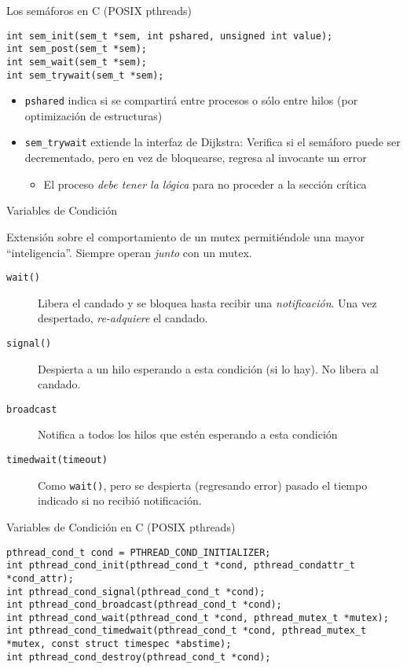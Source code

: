 \documentclass[presentation]{beamer}
\begin{document}
\begin{frame}[label={sec:org82672c1},fragile]{Los semáforos en C (POSIX pthreads)}
 \begin{verbatim}
int sem_init(sem_t *sem, int pshared, unsigned int value);
int sem_post(sem_t *sem);
int sem_wait(sem_t *sem);
int sem_trywait(sem_t *sem);
\end{verbatim}

\begin{itemize}
\item \texttt{pshared} indica si se compartirá entre procesos o sólo entre hilos
(por optimización de estructuras)
\item \texttt{sem\_trywait} extiende la interfaz de Dijkstra: Verifica si el
semáforo puede ser decrementado, pero en vez de bloquearse, regresa
al invocante un error
\begin{itemize}
\item El proceso \emph{debe tener la lógica} para no proceder a la sección
crítica
\end{itemize}
\end{itemize}
\end{frame}

\begin{frame}[label={sec:orgc8ec4ff},fragile]{Variables de Condición}
 \begin{center}
Extensión sobre el comportamiento de un mutex permitiéndole una mayor
``inteligencia''. Siempre operan \emph{junto} con un mutex.
\end{center}
\begin{description}
\item[{\texttt{wait()}}] Libera el candado y se bloquea hasta recibir una
\emph{notificación}. Una vez despertado, \emph{re-adquiere} el
candado.
\item[{\texttt{signal()}}] Despierta a un hilo esperando a esta condición (si
lo hay). No libera al candado.
\item[{\texttt{broadcast}}] Notifica a todos los hilos que estén esperando a
esta condición
\item[{\texttt{timedwait(timeout)}}] Como \texttt{wait()}, pero se despierta
(regresando error) pasado el tiempo indicado si no recibió
notificación.
\end{description}
\end{frame}

\begin{frame}[label={sec:orgef709df},fragile]{Variables de Condición en C (POSIX pthreads)}
 \begin{verbatim}
pthread_cond_t cond = PTHREAD_COND_INITIALIZER;
int pthread_cond_init(pthread_cond_t *cond, pthread_condattr_t *cond_attr);
int pthread_cond_signal(pthread_cond_t *cond);
int pthread_cond_broadcast(pthread_cond_t *cond);
int pthread_cond_wait(pthread_cond_t *cond, pthread_mutex_t *mutex);
int pthread_cond_timedwait(pthread_cond_t *cond, pthread_mutex_t *mutex, const struct timespec *abstime);
int pthread_cond_destroy(pthread_cond_t *cond);
\end{verbatim}
\end{frame}
\end{document}
